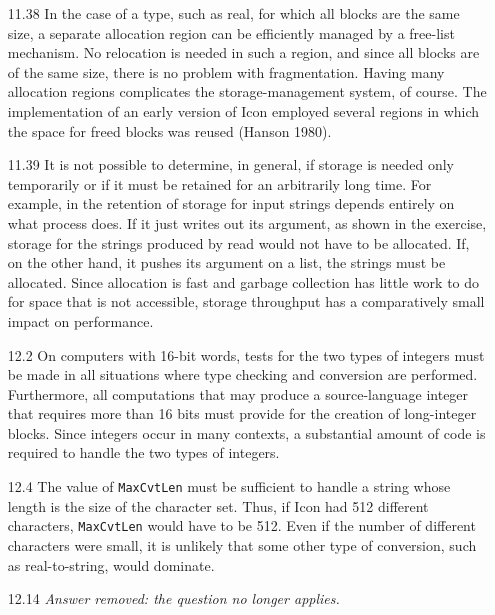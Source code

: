 \begin{itemize}
\goodbreak\item[11.38]
In the case of a type, such as real, for which all blocks are the same size, a
separate allocation region can be efficiently managed by a free-list
mechanism. No relocation is needed in such a region, and since all blocks
are of the same size, there is no problem with fragmentation. Having
many allocation regions complicates the storage-management system, of
course. The implementation of an early version of Icon employed several
regions in which the space for freed blocks was reused (Hanson 1980).

\goodbreak\item[11.39]
It is not possible to determine, in general, if storage is needed only temporarily
or if it must be retained for an arbitrarily long time. For example, in
the retention of storage for input strings depends entirely on what process
does. If it just writes out its argument, as shown in the exercise, storage
for the strings produced by read would not have to be allocated. If, on
the other hand, it pushes its argument on a list, the strings must be allocated.
Since allocation is fast and garbage collection has little work to do
for space that is not accessible, storage throughput has a comparatively
small impact on performance.

\goodbreak\item[12.2]
On computers with 16-bit words, tests for the two types of integers must
be made in all situations where type checking and conversion are performed.
Furthermore, all computations that may produce a source-language
integer that requires more than 16 bits must provide for the
creation of long-integer blocks. Since integers occur in many contexts, a
substantial amount of code is required to handle the two types of integers.

\goodbreak\item[12.4]
The value of \texttt{MaxCvtLen} must be sufficient to handle a string whose
length is the size of the character set. Thus, if Icon had 512 different characters,
\texttt{MaxCvtLen} would have to be 512. Even if the number of different
characters were small, it is unlikely that some other type of conversion,
such as real-to-string, would dominate.

\goodbreak\item[12.14]
{\em Answer removed: the question no longer applies.}

\end{itemize}
